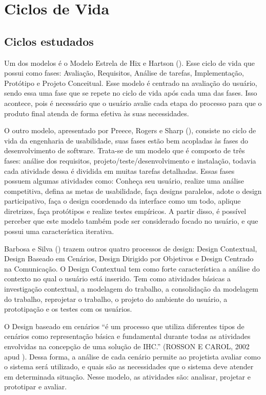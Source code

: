 \chapter{Ciclos de Vida}

\section{Ciclos estudados}
Um dos modelos é o Modelo Estrela de Hix e Hartson (\citeyear{hix}). Esse ciclo de vida que possui como fases: Avaliação, Requisitos, Análise de tarefas, 
Implementação, Protótipo e Projeto Conceitual. Esse modelo é centrado na avaliação do usuário, sendo essa uma fase que se repete no ciclo de vida após cada uma das fases.
Isso acontece, pois é necessário que o usuário avalie cada etapa do processo para que o produto final atenda de forma efetiva às suas necessidades.

O outro modelo, apresentado por Preece, Rogers e Sharp (\citeyear{preece}), consiste no ciclo de vida da engenharia de usabilidade, suas fases estão bem acopladas às fases 
do desenvolvimento de software. Trata-se de um modelo que é composto de três fases: análise dos requisitos, projeto/teste/desenvolvimento e instalação, todavia 
cada atividade dessa é dividida em muitas tarefas detalhadas. Essas fases possuem algumas atividades como: Conheça seu usuário, realize uma análise competitiva, 
defina as metas de usabilidade, faça designs paralelos, adote o design participativo, faça o design coordenado da interface como um todo, aplique diretrizes, 
faça protótipos e realize testes empíricos. A partir disso, é possível perceber que este modelo também pode ser considerado focado no usuário, e que possui uma 
característica iterativa.

Barbosa e Silva (\citeyear{BARBOSA}) trazem outros quatro processos de design: Design Contextual, Design Baseado em Cenários, Design Dirigido por Objetivos e Design Centrado na 
Comunicação. O Design Contextual tem como forte característica a análise do contexto no qual o usuário está inserido. Tem como atividades básicas a investigação contextual,
a modelagem do trabalho, a consolidação da modelagem do trabalho, reprojetar o trabalho, o projeto do ambiente do usuário, a prototipação e os testes com os usuários.

O Design baseado em cenários “é um processo que utiliza diferentes tipos de cenários como representação básica e fundamental durante todas as atividades envolvidas 
na concepção de uma solução de IHC.” (ROSSON E CAROL, 2002 apud \cite{BARBOSA}). Dessa forma, a análise de cada cenário permite ao projetista avaliar como o 
sistema será utilizado, e quais são as necessidades que o sistema deve atender em determinada situação. Nesse modelo, as atividades são: analisar, projetar e prototipar 
e avaliar.

